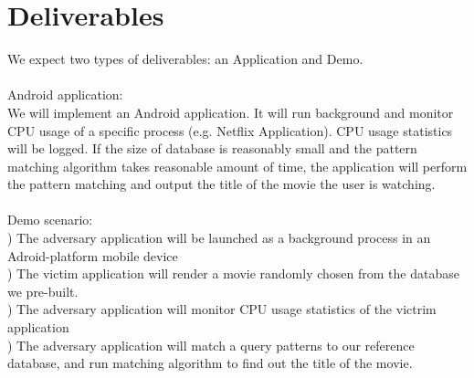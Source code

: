 \section{Deliverables}
\label{sec:deliverables}
\indent We expect two types of deliverables: an Application and Demo.\\\\
Android application: \\
\indent We will implement an Android application.
It will run background and monitor CPU usage of a specific process (e.g. Netflix Application).
CPU usage statistics will be logged.
If the size of database is reasonably small and the pattern matching algorithm takes reasonable amount of time, 
the application will perform the pattern matching and output the title of the movie the user is watching. 
\\\\
Demo scenario: \\
) The adversary application will be launched as a background process in an Adroid-platform mobile device\\
) The victim application will render a movie randomly chosen from the database we pre-built. \\
) The adversary application will monitor CPU usage statistics of the victrim application\\
) The adversary application will match a query patterns to our reference database, and run matching algorithm to find out the title of the movie.\\



